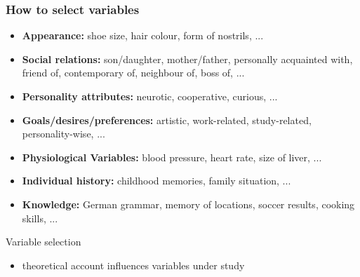 \documentclass[]{beamer}
\begin{document}
\begin{frame}
 \frametitle{How to select variables}
\begin{itemize}[<+->]
 \item []\textbf{Appearance:} shoe size, hair colour, form of nostrils, ...
 \item []\textbf{Social relations:} son/daughter, mother/father, personally
acquainted with, friend of, contemporary of, neighbour of, boss of, ...
 \item []\textbf{Personality attributes:} neurotic, cooperative, curious, ...
 \item []\textbf{Goals/desires/preferences:} artistic, work-related,
study-related, personality-wise, ...
 \item []\textbf{Physiological Variables:} blood pressure, heart rate, size of
liver, ...
 \item []\textbf{Individual history:} childhood memories, family situation, ...
 \item []\textbf{Knowledge:} German grammar, memory of locations, soccer
results,
cooking skills, ...
\end{itemize}
\end{frame}


\begin{frame}{Variable selection}
\begin{itemize}
 \item []theoretical account influences variables under study
\end{itemize}

\end{frame}
\end{document}
